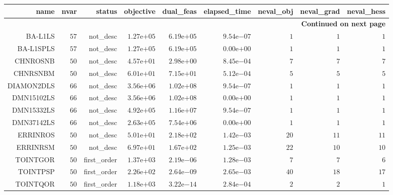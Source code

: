 \begin{longtable}{rrrrrrrrr}
\hline
name & nvar & status & objective & dual\_feas & elapsed\_time & neval\_obj & neval\_grad & neval\_hess \\\hline
\endhead
\hline
\multicolumn{9}{r}{{\bfseries Continued on next page}}\\
\hline
\endfoot
\endlastfoot
BA-L1LS & \(    57\) & not\_desc & \( 1.27\)e\(+05\) & \( 6.19\)e\(+05\) & \( 9.54\)e\(-07\) & \(     1\) & \(     1\) & \(     1\) \\
BA-L1SPLS & \(    57\) & not\_desc & \( 1.27\)e\(+05\) & \( 6.19\)e\(+05\) & \( 0.00\)e\(+00\) & \(     1\) & \(     1\) & \(     1\) \\
CHNROSNB & \(    50\) & not\_desc & \( 4.57\)e\(+01\) & \( 2.98\)e\(+00\) & \( 8.45\)e\(-04\) & \(     7\) & \(     7\) & \(     7\) \\
CHNRSNBM & \(    50\) & not\_desc & \( 6.01\)e\(+01\) & \( 7.15\)e\(+01\) & \( 5.12\)e\(-04\) & \(     5\) & \(     5\) & \(     5\) \\
DIAMON2DLS & \(    66\) & not\_desc & \( 3.56\)e\(+06\) & \( 1.02\)e\(+08\) & \( 9.54\)e\(-07\) & \(     1\) & \(     1\) & \(     1\) \\
DMN15102LS & \(    66\) & not\_desc & \( 3.56\)e\(+06\) & \( 1.02\)e\(+08\) & \( 0.00\)e\(+00\) & \(     1\) & \(     1\) & \(     1\) \\
DMN15332LS & \(    66\) & not\_desc & \( 4.92\)e\(+05\) & \( 1.16\)e\(+07\) & \( 9.54\)e\(-07\) & \(     1\) & \(     1\) & \(     1\) \\
DMN37142LS & \(    66\) & not\_desc & \( 2.63\)e\(+05\) & \( 7.54\)e\(+06\) & \( 0.00\)e\(+00\) & \(     1\) & \(     1\) & \(     1\) \\
ERRINROS & \(    50\) & not\_desc & \( 5.01\)e\(+01\) & \( 2.18\)e\(+02\) & \( 1.42\)e\(-03\) & \(    20\) & \(    11\) & \(    11\) \\
ERRINRSM & \(    50\) & not\_desc & \( 6.97\)e\(+01\) & \( 1.67\)e\(+02\) & \( 1.25\)e\(-03\) & \(    22\) & \(    10\) & \(    10\) \\
TOINTGOR & \(    50\) & first\_order & \( 1.37\)e\(+03\) & \( 2.19\)e\(-06\) & \( 1.28\)e\(-03\) & \(     7\) & \(     7\) & \(     6\) \\
TOINTPSP & \(    50\) & first\_order & \( 2.26\)e\(+02\) & \( 2.64\)e\(-09\) & \( 2.65\)e\(-03\) & \(    40\) & \(    18\) & \(    17\) \\
TOINTQOR & \(    50\) & first\_order & \( 1.18\)e\(+03\) & \( 3.22\)e\(-14\) & \( 2.84\)e\(-04\) & \(     2\) & \(     2\) & \(     1\) \\\hline
\end{longtable}
